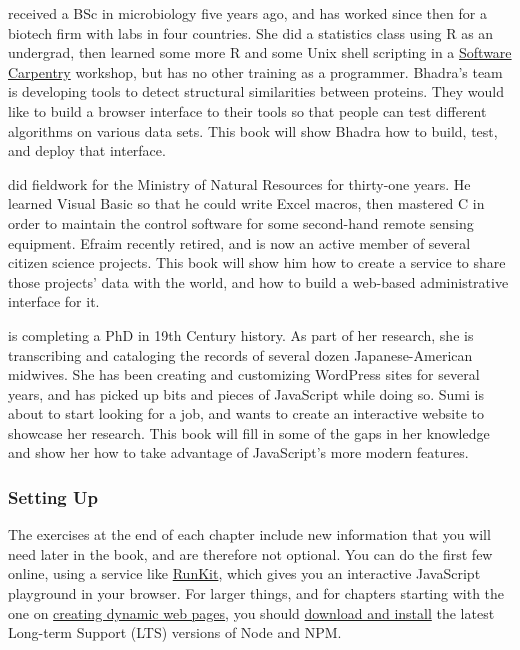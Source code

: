 \begin{description}
\tightlist
\item[Bhadra]
received a BSc in microbiology five years ago, and has worked since then
for a biotech firm with labs in four countries. She did a statistics
class using R as an undergrad, then learned some more R and some Unix
shell scripting in a \href{http://software-carpentry.org/}{Software
Carpentry} workshop, but has no other training as a programmer. Bhadra's
team is developing tools to detect structural similarities between
proteins. They would like to build a browser interface to their tools so
that people can test different algorithms on various data sets. This
book will show Bhadra how to build, test, and deploy that interface.
\item[Efraim]
did fieldwork for the Ministry of Natural Resources for thirty-one
years. He learned Visual Basic so that he could write Excel macros, then
mastered C in order to maintain the control software for some
second-hand remote sensing equipment. Efraim recently retired, and is
now an active member of several citizen science projects. This book will
show him how to create a service to share those projects' data with the
world, and how to build a web-based administrative interface for it.
\item[Sumi]
is completing a PhD in 19th Century history. As part of her research,
she is transcribing and cataloging the records of several dozen
Japanese-American midwives. She has been creating and customizing
WordPress sites for several years, and has picked up bits and pieces of
JavaScript while doing so. Sumi is about to start looking for a job, and
wants to create an interactive website to showcase her research. This
book will fill in some of the gaps in her knowledge and show her how to
take advantage of JavaScript's more modern features.
\end{description}

\subsubsection{Setting Up}\label{s:intro-setup}

The exercises at the end of each chapter include new information that
you will need later in the book, and are therefore not optional. You can
do the first few online, using a service like
\href{https://runkit.com/}{RunKit}, which gives you an interactive
JavaScript playground in your browser. For larger things, and for
chapters starting with the one on \protect\hyperlink{s:dynamic}{creating
dynamic web pages}, you should
\href{https://nodejs.org/en/download/}{download and install} the latest
Long-term Support (LTS) versions of Node and NPM.

